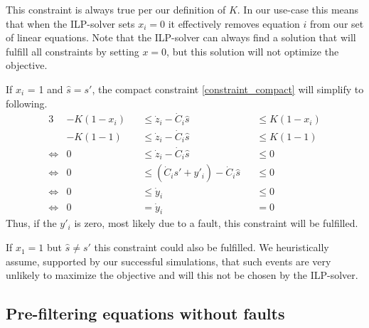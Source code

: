 This constraint is always true per our definition of $K$. In our use-case this means that when the ILP-solver sets $x_{i} = 0$ it effectively removes equation $i$ from our set of linear equations.
Note that the ILP-solver can always find a solution that will fulfill all constraints by setting $x = 0$, but this solution will not optimize the objective.  

If $x_{i}$ = 1 and $\hat{s} = s'$, the compact constraint \eqref{constraint_compact} will simplify to following.
\begin{alignat}{3}
&-K(1 - x_{i}) &&\leq \dot{z}_{i} - \dot{C}_{i}\hat{s}  &&\leq K (1 - x_{i}) \\
&-K(1 - 1) &&\leq \dot{z}_{i} - \dot{C}_{i}\hat{s}  &&\leq K (1 - 1) \\
\Leftrightarrow&0&&\leq \dot{z}_{i} - \dot{C}_{i}\hat{s}  &&\leq 0 \\
\Leftrightarrow&0 &&\leq  (\dot{C}_{i}s' + y'_{i}) - \dot{C}_{i}\hat{s}  &&\leq 0 \\
\Leftrightarrow&0&&\leq  \dot{y}_{i}  &&\leq 0 \\
 \Leftrightarrow&0&&=  \dot{y}_{i}   &&= 0
\end{alignat}
Thus, if the $y'_{i}$ is zero, most likely due to a fault, this constraint will be fulfilled.

If $x_1 = 1$ but $\hat{s} \neq s'$ this constraint could also be fulfilled.
We heuristically assume, supported by our successful simulations, that such events are very unlikely to maximize the objective and will this not be chosen by the ILP-solver.


\subsection{Pre-filtering equations without faults}
\label{sec:prefilter}


